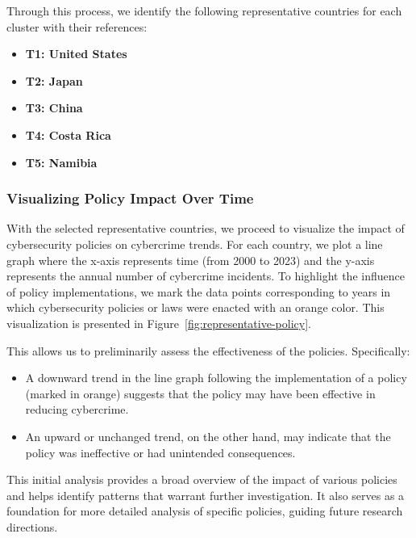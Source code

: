         Through this process, we identify the following representative countries for each cluster with their references:
        \begin{itemize}
            \item \textbf{T1: United States}
            \item \textbf{T2: Japan}
            \item \textbf{T3: China}
            \item \textbf{T4: Costa Rica}
            \item \textbf{T5: Namibia}
        \end{itemize}
    
    \subsubsection*{Visualizing Policy Impact Over Time} %
        With the selected representative countries,
        we proceed to visualize the impact of cybersecurity policies on cybercrime trends.
        For each country, we plot a line graph where
        the x-axis represents time (from 2000 to 2023) and the y-axis represents the annual number of cybercrime incidents.
        To highlight the influence of policy implementations,
        we mark the data points corresponding to years in which cybersecurity policies or laws were enacted with an orange color.
        This visualization is presented in Figure~\ref{fig:representative-policy}.
    
        This allows us to preliminarily assess the effectiveness of the policies.
        Specifically:
        \begin{itemize}
            \item A downward trend in the line graph following the implementation of a policy (marked in orange)
            suggests that the policy may have been effective in reducing cybercrime.
            \item An upward or unchanged trend, on the other hand,
            may indicate that the policy was ineffective or had unintended consequences.
        \end{itemize}
    
        This initial analysis provides a broad overview of the impact of various policies and
        helps identify patterns that warrant further investigation.
        It also serves as a foundation for more detailed analysis of specific policies, guiding future research directions.
    
